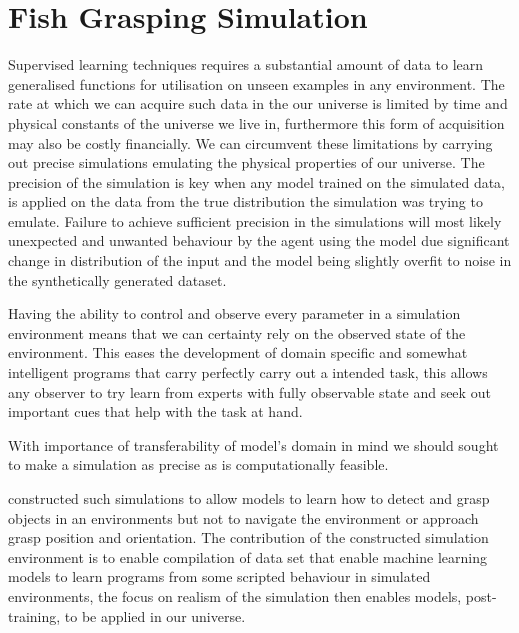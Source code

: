 \section{Fish Grasping Simulation}\label{sec:simulation}

Supervised learning techniques requires a substantial amount of data to learn generalised functions for utilisation on unseen examples in any environment. The rate at which we can acquire such data in the our universe is limited by time and physical constants of the universe we live in, furthermore this form of acquisition may also be costly financially. We can circumvent these limitations by carrying out precise simulations emulating the physical properties of our universe. The precision of the simulation is key when any model trained on the simulated data, is applied on the data from the true distribution %
the simulation was trying to emulate. 
Failure to achieve sufficient precision in the simulations will most likely unexpected and unwanted behaviour by the agent using the model due significant change in distribution of the input and the model being slightly overfit to noise in the synthetically generated dataset.

Having the ability to control and observe every parameter in a simulation environment means that we can certainty rely on the observed state of the environment. This eases the development of domain specific and somewhat intelligent programs that carry perfectly carry out a intended task, this allows any observer to try learn from experts with fully observable state and seek out important cues that help with the task at hand.   

With importance of transferability of model's domain in mind we should sought to make a simulation as precise as is computationally feasible.

\cite{Dyrstad2016} constructed such simulations to allow models to learn how to detect and grasp objects in an environments but not to navigate the environment or approach grasp position and orientation. The contribution of the constructed simulation environment is to enable compilation of data set that enable machine learning models to learn programs from some scripted behaviour in simulated environments, the focus on realism of the simulation then enables models, post-training, to be applied in our universe.

